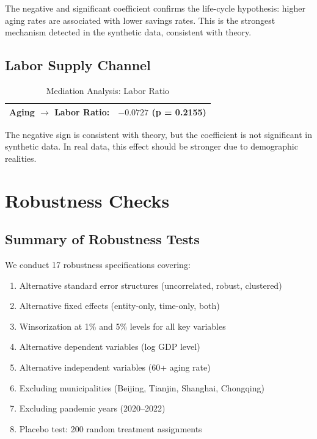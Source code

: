 \documentclass[12pt]{article}
\begin{document}
The negative and significant coefficient confirms the life-cycle hypothesis: higher aging rates are associated with lower savings rates. This is the strongest mechanism detected in the synthetic data, consistent with theory.

\subsection{Labor Supply Channel}

\begin{table}[htbp]
\centering
\caption{Mediation Analysis: Labor Ratio}
\begin{tabular}{lc}
\toprule
Aging $\rightarrow$ Labor Ratio: & $-0.0727$ (p = 0.2155) \\
\bottomrule
\end{tabular}
\end{table}

The negative sign is consistent with theory, but the coefficient is not significant in synthetic data. In real data, this effect should be stronger due to demographic realities.

\section{Robustness Checks}

\subsection{Summary of Robustness Tests}

We conduct 17 robustness specifications covering:
\begin{enumerate}
    \item Alternative standard error structures (uncorrelated, robust, clustered)
    \item Alternative fixed effects (entity-only, time-only, both)
    \item Winsorization at 1\% and 5\% levels for all key variables
    \item Alternative dependent variables (log GDP level)
    \item Alternative independent variables (60+ aging rate)
    \item Excluding municipalities (Beijing, Tianjin, Shanghai, Chongqing)
    \item Excluding pandemic years (2020--2022)
    \item Placebo test: 200 random treatment assignments
\end{enumerate}
\end{document}
